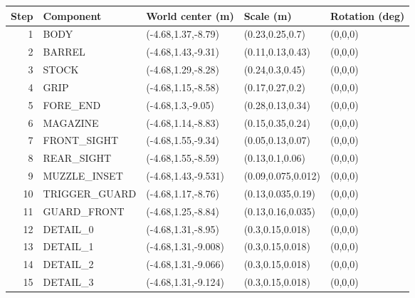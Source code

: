 \begin{center}\normalsize\begin{tabular}{rllll}\toprule
Step & Component & World center (m) & Scale (m) & Rotation (deg) \\\midrule
1 & BODY & (-4.68,1.37,-8.79) & (0.23,0.25,0.7) & (0,0,0) \\
2 & BARREL & (-4.68,1.43,-9.31) & (0.11,0.13,0.43) & (0,0,0) \\
3 & STOCK & (-4.68,1.29,-8.28) & (0.24,0.3,0.45) & (0,0,0) \\
4 & GRIP & (-4.68,1.15,-8.58) & (0.17,0.27,0.2) & (0,0,0) \\
5 & FORE\_END & (-4.68,1.3,-9.05) & (0.28,0.13,0.34) & (0,0,0) \\
6 & MAGAZINE & (-4.68,1.14,-8.83) & (0.15,0.35,0.24) & (0,0,0) \\
7 & FRONT\_SIGHT & (-4.68,1.55,-9.34) & (0.05,0.13,0.07) & (0,0,0) \\
8 & REAR\_SIGHT & (-4.68,1.55,-8.59) & (0.13,0.1,0.06) & (0,0,0) \\
9 & MUZZLE\_INSET & (-4.68,1.43,-9.531) & (0.09,0.075,0.012) & (0,0,0) \\
10 & TRIGGER\_GUARD & (-4.68,1.17,-8.76) & (0.13,0.035,0.19) & (0,0,0) \\
11 & GUARD\_FRONT & (-4.68,1.25,-8.84) & (0.13,0.16,0.035) & (0,0,0) \\
12 & DETAIL\_0 & (-4.68,1.31,-8.95) & (0.3,0.15,0.018) & (0,0,0) \\
13 & DETAIL\_1 & (-4.68,1.31,-9.008) & (0.3,0.15,0.018) & (0,0,0) \\
14 & DETAIL\_2 & (-4.68,1.31,-9.066) & (0.3,0.15,0.018) & (0,0,0) \\
15 & DETAIL\_3 & (-4.68,1.31,-9.124) & (0.3,0.15,0.018) & (0,0,0) \\
\bottomrule\end{tabular}\end{center}
